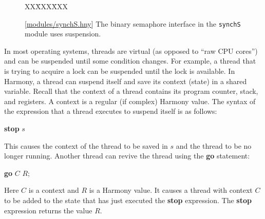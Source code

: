 \documentclass{report}
\newcommand{\harmonysource}[1]{
\begin{tabbing}
XX\=XXX\=XXX\kill
    
\end{tabbing}
}
\newcommand{\harmonylink}[1]{%
[\href{https://harmony.cs.cornell.edu/#1}{\underline{#1}}]%
}
\newenvironment{code}{
\tcolorbox
}{
\endtcolorbox
}
\begin{document}
\begin{figure}
\begin{code}
\harmonysource{locksusp}
\end{code}
\caption{\harmonylink{modules/synchS.hny} The binary semaphore interface in the \texttt{synchS} module uses suspension.}
\label{fig:suspension}
\end{figure}

In most operating systems, threads are virtual (as opposed to ``raw CPU cores'')
and can be suspended until some condition changes.
For example, a thread that is trying to acquire a lock can be suspended until the lock is
available.
In Harmony, a thread can suspend itself and save its context (state) in a
shared variable.  Recall that the context of a thread contains
its program counter, stack, and registers.
A context is a regular (if complex) Harmony value.
The syntax of the expression that a thread executes to suspend itself
is as follows:

\begin{code}
\textbf{stop} $s$
\end{code}

This causes the context of the thread to be saved in $s$ and
the thread to be no longer running.
Another thread can revive the thread using the \textbf{go}
%
statement:

\begin{code}
\textbf{go} $C$ $R$;
\end{code}

Here $C$ is a context and $R$ is a Harmony value.
It causes a thread with context $C$ to be added to the state that has
just executed the \textbf{stop}
%
expression.  The \textbf{stop} expression returns the value $R$.
\end{document}
